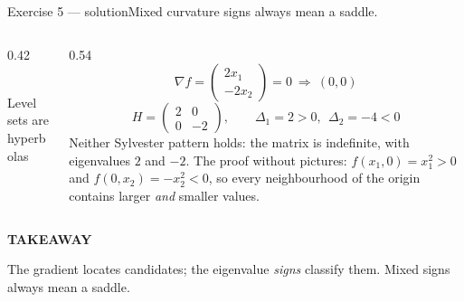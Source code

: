 \documentclass[aspectratio=169,11pt]{beamer}
\newcommand{\kicker}[1]{{\color{hseaccent}\scriptsize\bfseries\MakeUppercase{#1}}}
\newcommand{\takeaway}[2]{%
  \par\smallskip\noindent
  \colorbox{hselight}{\parbox{\dimexpr\textwidth-2\fboxsep}{%
    \kicker{#1}\par\vspace{0.12em}\footnotesize #2}}\par}
\begin{document}
\begin{frame}{Exercise 5 --- solution}{Mixed curvature signs always mean a saddle.}
  \vspace{0.2em}
  \begin{columns}[T,onlytextwidth]
    \begin{column}{0.42\textwidth}\centering
      \\[0.2em]
      {\scriptsize Level sets are hyperbolas}
    \end{column}
    \begin{column}{0.54\textwidth}
      \[ \nabla f=\begin{pmatrix}2x_1\\-2x_2\end{pmatrix}=0\ \Rightarrow\ (0,0) \]
      \[ H=\begin{pmatrix}2&0\\0&-2\end{pmatrix},\qquad \Delta_1=2>0,\ \ \Delta_2=-4<0 \]
      {\footnotesize Neither Sylvester pattern holds: the matrix is indefinite, with eigenvalues $2$ and $-2$.
        The proof without pictures: $f(x_1,0)=x_1^{2}>0$ and $f(0,x_2)=-x_2^{2}<0$, so every neighbourhood of the
        origin contains larger \emph{and} smaller values.}
    \end{column}
  \end{columns}
  \vspace{0.3em}
  \takeaway{takeaway}{The gradient locates candidates; the eigenvalue \emph{signs} classify them.
    Mixed signs always mean a saddle.}
\end{frame}
\end{document}
